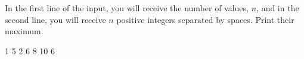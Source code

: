 




In the first line of the input, you will receive the number of values, $n$, and in the second line, you will receive $n$ positive integers separated by spaces. Print their maximum.

1 5 2 6 8 10 6
\koniec

